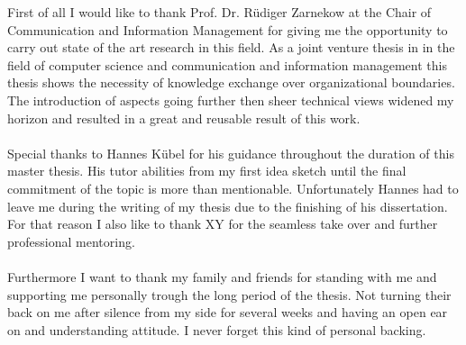 \thispagestyle{empty}
\vspace*{3cm}

\vspace*{1cm}
\noindent 
First of all I would like to thank Prof. Dr. Rüdiger Zarnekow at the Chair of Communication and Information Management for giving me the opportunity to carry out state of the art research in this field. As a joint venture thesis in in the field of computer science and communication and information management this thesis shows the necessity of knowledge exchange over organizational boundaries. The introduction of aspects going further then sheer technical views widened my horizon and resulted in a great and reusable result of this work. 
\\
\\
Special thanks to Hannes Kübel for his guidance throughout the duration of this master thesis. His tutor abilities from my first idea sketch until the final commitment of the topic is more than mentionable. Unfortunately Hannes had to leave me during the writing of my thesis due to the finishing of his dissertation. For that reason I also like to thank XY for the seamless take over and further professional mentoring.
\\
\\
Furthermore I want to thank my family and friends for standing with me and supporting me personally trough the long period of the thesis. Not turning their back on me after silence from my side for several weeks and having an open ear on and understanding attitude. I never forget this kind of personal backing.